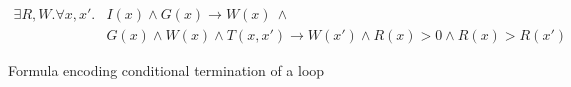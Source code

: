 \documentclass[a4paper]{llncs}
\begin{document}






\begin{figure*}
 \begin{framed}

\begin{definition}
\label{def:ct}
 \begin{align*}
  \exists R, W . \forall x, x' . & I(x) \wedge G(x) \rightarrow W(x) ~ \wedge \\
                                 & G(x) \wedge W(x) \wedge T(x, x') \rightarrow W(x') \wedge R(x) > 0 
  \wedge R(x) > R(x')
 \end{align*}
\end{definition}

 \end{framed}
\caption{Formula encoding conditional termination of a loop} \label{fig:conditional_termination}
\end{figure*}
\end{document}
